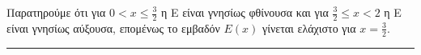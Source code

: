 \begin{alist}
Παρατηρούμε ότι για $0 < x \le \frac{3}{2}$ η Ε είναι γνησίως φθίνουσα και για $\frac{3}{2} \le x < 2$ η Ε είναι γνησίως αύξουσα, επομένως το εμβαδόν $E(x)$ γίνεται ελάχιστο για $x = \frac{3}{2}$.
\end{alist}
\vspace{6mm}
\noindent\rule{\textwidth}{0.4pt}
\vspace{6mm}

